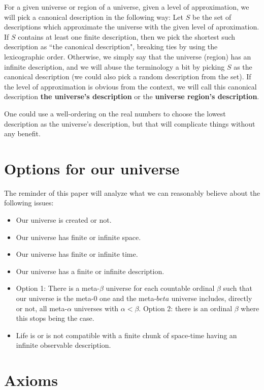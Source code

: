 \documentclass[a4paper
,draft
]{article}
\newcommand{\definitie}[1]{\textbf{#1}}
\newcommand{\ghilimele}[1]{``#1"}
\begin{document}
For a given universe or region of a universe,
given a level of approximation, we will pick a canonical description
in the following way: Let $S$ be the set of descriptions which approximate
the universe with the given level of aproximation. If $S$ contains
at least one finite description, then we pick the shortest such
description as \ghilimele{the canonical description}, breaking ties by
using the lexicographic order. Otherwise, we simply say that the
universe (region) has an infinite description, and we will abuse the
terminology a bit by picking $S$ as the canonical description (we could
also pick a random description from the set).
If the level of approximation is obvious from the context, we will call
this canonical description \definitie{the universe's description}
or the \definitie{universe region's description}.

One could use a well-ordering on the real numbers to choose the
lowest description as the universe's description, but that will
complicate things without any benefit.

\section{Options for our universe}

The reminder of this paper will analyze what we can reasonably believe about
the following issues:
\begin{itemize}
  \item Our universe is created or not.
  \item Our universe has finite or infinite space.
  \item Our universe has finite or infinite time.
  \item Our universe has a finite or infinite description.
  \item Option 1: There is a meta-$\beta$ universe for each countable ordinal
        $\beta$ such that our universe is the meta-$0$ one and the meta-$beta$
        universe includes, directly or not, all meta-$\alpha$ universes with
        $\alpha < \beta$. Option 2: there is an ordinal $\beta$ where this
        stops being the case.
  \item Life is or is not compatible with a finite chunk of space-time having
        an infinite observable description.
\end{itemize}

\section{Axioms}
\end{document}
